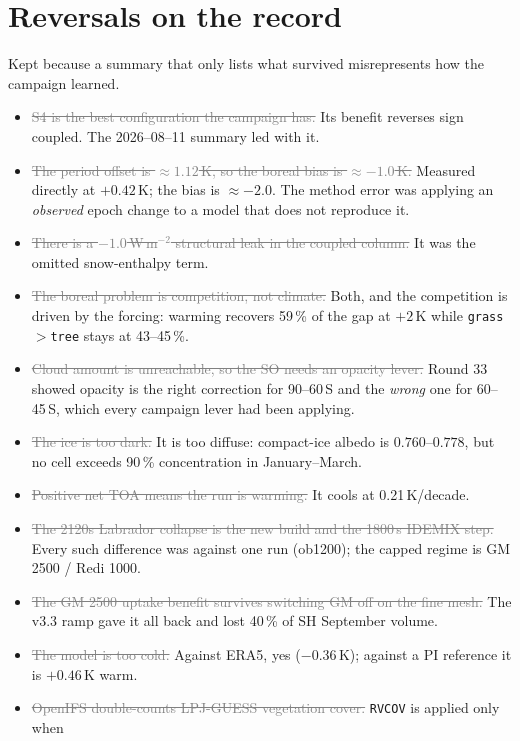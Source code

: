 \documentclass[10pt]{article}
\newcommand{\dead}[1]{\textcolor{gray}{\sout{#1}}}
\begin{document}
\section{Reversals on the record}\label{sec:reversals}

Kept because a summary that only lists what survived misrepresents how the campaign
learned.

\begin{itemize}\itemsep1pt
\item \dead{S4 is the best configuration the campaign has.} Its benefit reverses sign
coupled. The 2026--08--11 summary led with it.
\item \dead{The period offset is ${\approx}1.12$\,K, so the boreal bias is
${\approx}-1.0$\,K.} Measured directly at $+0.42$\,K; the bias is ${\approx}-2.0$. The
method error was applying an \emph{observed} epoch change to a model that does not reproduce
it.
\item \dead{There is a $-1.0$\,W\,m$^{-2}$ structural leak in the coupled column.} It was
the omitted snow-enthalpy term.
\item \dead{The boreal problem is competition, not climate.} Both, and the competition is
driven by the forcing: warming recovers 59\,\% of the gap at $+2$\,K while
\texttt{grass$>$tree} stays at 43--45\,\%.
\item \dead{Cloud amount is unreachable, so the SO needs an opacity lever.} Round 33 showed
opacity is the right correction for 90--60\,S and the \emph{wrong} one for 60--45\,S, which
every campaign lever had been applying.
\item \dead{The ice is too dark.} It is too diffuse: compact-ice albedo is
$0.760$--$0.778$, but no cell exceeds 90\,\% concentration in January--March.
\item \dead{Positive net TOA means the run is warming.} It cools at 0.21\,K/decade.
\item \dead{The 2120s Labrador collapse is the new build and the 1800\,s IDEMIX step.} Every such
difference was against one run (ob1200); the capped regime is GM 2500 / Redi 1000.
\item \dead{The GM 2500 uptake benefit survives switching GM off on the fine mesh.} The v3.3 ramp
gave it all back and lost 40\,\% of SH September volume.
\item \dead{The model is too cold.} Against ERA5, yes ($-0.36$\,K); against a PI reference it is
$+0.46$\,K warm.
\item \dead{OpenIFS double-counts LPJ-GUESS vegetation cover.} \texttt{RVCOV} is applied only when

\end{itemize}
\end{document}
